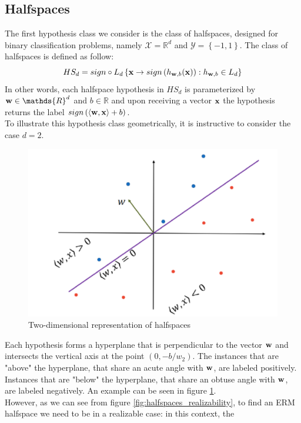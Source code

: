 \documentclass[12pt]{report}
\theoremstyle{plain}
\newcommand\mcl[1]{\mathcal{#1}}
\newcommand\sprod[2]{\langle \vb{#1},\vb{#2}\rangle}
\begin{document}
\begin{flushleft}
\section{Halfspaces}
The first hypothesis class we consider is the class of halfspaces, designed for 
binary classification problems, namely $\mcl{X}=\mathds{R}^d$ and 
$\mcl{Y}=\left\{-1,1\right\}$. The class of halfspaces is defined as follow:
\[ HS_d=sign\circ L_d \left\{\vb{x}\to 
sign\left(h_{\vb{w},b}(\vb{x})\right):h_{\vb{w},b}\in L_d \right\} \]
In other words, each halfspace hypothesis in $HS_d$ is parameterized by 
$\vb{w}\in\mathds{R}^d$ and $b\in\mathds{R}$ and upon receiving a vector 
$\vb{x}$ the hypothesis returns the label 
$sign\left(\sprod{\vb{w}}{\vb{x}}+b\right)$.\\
To illustrate this hypothesis class geometrically, it is instructive to 
consider the case $d=2$.
\begin{figure}[!h]
	\centering
	\includegraphics[scale=0.5]{images/halfspaces_2D.pdf}
	\caption{Two-dimensional representation of halfspaces}
	\label{fig:halfspaces_2D}
\end{figure}
Each hypothesis forms a hyperplane that is perpendicular to the vector $\vb{w}$ 
and intersects the vertical axis at the 
point $(0,-b/w_2)$. The instances that are "above" the hyperplane, that share 
an acute angle with $\vb{w}$, are labeled positively. Instances that are 
"below" the hyperplane, that share an obtuse angle with $\vb{w}$, are labeled 
negatively. An example can be seen in figure \ref{fig:halfspaces_2D}.\\
However, as we can see from figure \ref{fig:halfspaces_realizability}, to find 
an ERM halfspace we need to be in a realizable case: in this context, the 

\end{flushleft}
\end{document}
